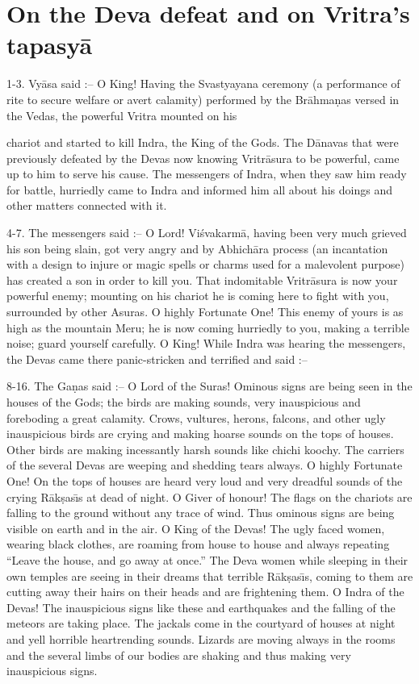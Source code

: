 \chapter{On the Deva defeat and on Vritra's tapasy\=a}

1-3. Vy\=asa said :-- O King! Having the Svastyayana ceremony (a performance of rite to secure welfare or avert calamity) performed by the Br\=ahma\d{n}as versed in the Vedas, the powerful Vritra mounted on his

chariot and started to kill Indra, the King of the Gods. The D\=anavas that were previously defeated by the Devas now knowing Vritr\=asura to be powerful, came up to him to serve his cause. The messengers of Indra, when they saw him ready for battle, hurriedly came to Indra and informed him all about his doings and other matters connected with it.

4-7. The messengers said :-- O Lord! Vi\'svakarm\=a, having been very much grieved his son being slain, got very angry and by Abhich\=ara process (an incantation with a design to injure or magic spells or charms used for a malevolent purpose) has created a son in order to kill you. That indomitable Vritr\=asura is now your powerful enemy; mounting on his chariot he is coming here to fight with you, surrounded by other Asuras. O highly Fortunate One! This enemy of yours is as high as the mountain Meru; he is now coming hurriedly to you, making a terrible noise; guard yourself carefully. O King! While Indra was hearing the messengers, the Devas came there panic-stricken and terrified and said :--

8-16. The Ga\d{n}as said :-- O Lord of the Suras! Ominous signs are being seen in the houses of the Gods; the birds are making sounds, very inauspicious and foreboding a great calamity. Crows, vultures, herons, falcons, and other ugly inauspicious birds are crying and making hoarse sounds on the tops of houses. Other birds are making incessantly harsh sounds like chichi koochy. The carriers of the several Devas are weeping and shedding tears always. O highly Fortunate One! On the tops of houses are heard very loud and very dreadful sounds of the crying R\=ak\d{s}as\={\i}s at dead of night. O Giver of honour! The flags on the chariots are falling to the ground without any trace of wind. Thus ominous signs are being visible on earth and in the air. O King of the Devas! The ugly faced women, wearing black clothes, are roaming from house to house and always repeating ``Leave the house, and go away at once.'' The Deva women while sleeping in their own temples are seeing in their dreams that terrible R\=ak\d{s}as\={\i}s, coming to them are cutting away their hairs on their heads and are frightening them. O Indra of the Devas! The inauspicious signs like these and earthquakes and the falling of the meteors are taking place. The jackals come in the courtyard of houses at night and yell horrible heartrending sounds. Lizards are moving always in the rooms and the several limbs of our bodies are shaking and thus making very inauspicious signs.

